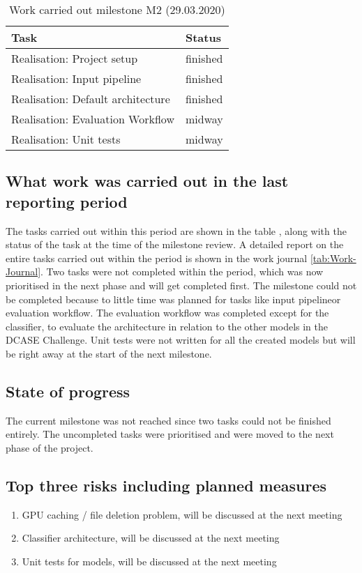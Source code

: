 \begin{table}[htbp]
    \centering
    \caption{Work carried out milestone M2 (29.03.2020)}
	\label{tab:Work-Carried-Out-M2}
    \begin{tabular}{p{} | p{}}
        \toprule
        \textbf{Task} & \textbf{Status} \\ 
        \midrule[1pt]
        Realisation: Project setup & finished \\
        \hline
        Realisation: Input pipeline & finished \\
        \hline
        Realisation: Default architecture & finished \\
        \hline
        Realisation: Evaluation Workflow & midway \\
        \hline
        Realisation: Unit tests & midway \\
        \bottomrule
    \end{tabular}
\end{table}

\subsection{What work was carried out in the last reporting period}
The tasks carried out within this period are shown in the table , along with the status of the task at the time of the milestone review. A detailed report on the entire tasks carried out within the period is shown in the work journal \ref{tab:Work-Journal}. Two tasks were not completed within the period, which was now prioritised in the next phase and will get completed first. The milestone could not be completed because to little time was planned for tasks like \flqq input pipeline\frqq or \flqq evaluation workflow\frqq. The evaluation workflow was completed except for the classifier, to evaluate the architecture in relation to the other models in the DCASE Challenge. Unit tests were not written for all the created models but will be right away at the start of the next milestone.

\subsection{State of progress}
The current milestone was not reached since two tasks could not be finished entirely. The uncompleted tasks were prioritised and were moved to the next phase of the project.

\subsection{Top three risks including planned measures}
\begin{enumerate}
    \setlength\itemsep{0em}
    \item GPU caching / file deletion problem, will be discussed at the next meeting
    \item Classifier architecture, will be discussed at the next meeting
    \item Unit tests for models, will be discussed at the next meeting 
\end{enumerate}

